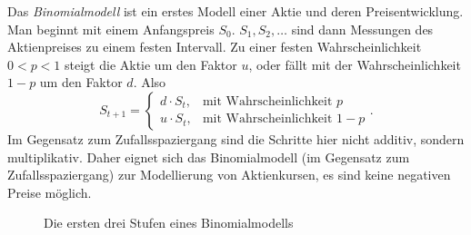 \begin{bsp}[Binomialmodell]
Das \textit{Binomialmodell} ist ein erstes Modell einer Aktie und deren Preisentwicklung. 
Man beginnt mit einem Anfangspreis $S_0$. $S_1, S_2, \dots$ sind dann Messungen des Aktienpreises zu einem festen Intervall.
 Zu einer festen Wahrscheinlichkeit $0 \lt p \lt 1$ steigt die Aktie um den Faktor $u$, oder fällt mit der Wahrscheinlichkeit $1-p$ um den Faktor $d$. Also
$$S_{t+1} = \begin{cases} 
    d \cdot S_t, & \text{mit Wahrscheinlichkeit }  p \\ 
    u \cdot S_t, & \text{mit Wahrscheinlichkeit }  1-p
\end{cases}.$$
Im Gegensatz zum Zufallsspaziergang sind die Schritte hier nicht additiv, sondern multiplikativ. Daher
eignet sich das Binomialmodell (im Gegensatz zum Zufallsspaziergang) zur Modellierung von Aktienkursen, es sind keine negativen Preise möglich.

\begin{figure}[h!]
\centering
{}
\caption{Die ersten drei Stufen eines Binomialmodells}
\label{fig:binomialtree}
\end{figure}

\end{bsp}
